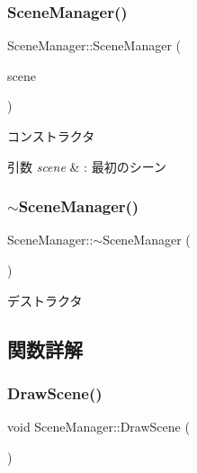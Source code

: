 \subsubsection{\texorpdfstring{Scene\+Manager()}{SceneManager()}}
{\footnotesize\ttfamily Scene\+Manager\+::\+Scene\+Manager (\begin{DoxyParamCaption}\item[{\mbox{\hyperlink{class_scene_bace}{Scene\+Bace}} $\ast$}]{scene }\end{DoxyParamCaption})}



コンストラクタ 


\begin{DoxyParams}{引数}
{\em scene} & \+: 最初のシーン \\
\hline
\end{DoxyParams}
\mbox{\label{class_scene_manager_a2bb376a85d29e85f47753e26c7539229}} 
\subsubsection{\texorpdfstring{$\sim$\+Scene\+Manager()}{~SceneManager()}}
{\footnotesize\ttfamily Scene\+Manager\+::$\sim$\+Scene\+Manager (\begin{DoxyParamCaption}{ }\end{DoxyParamCaption})}



デストラクタ 



\subsection{関数詳解}
\mbox{\label{class_scene_manager_a828b35826f757b8af34aa767c6b40378}} 
\subsubsection{\texorpdfstring{Draw\+Scene()}{DrawScene()}}
{\footnotesize\ttfamily void Scene\+Manager\+::\+Draw\+Scene (\begin{DoxyParamCaption}{ }\end{DoxyParamCaption})}



